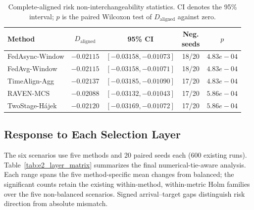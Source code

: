 \begin{table}[!htbp]
\centering
\caption{Complete-aligned risk non-interchangeability statistics.
CI denotes the 95\% interval; $p$ is the paired Wilcoxon test of
$D_{\mathrm{aligned}}$ against zero.}
\label{tab:app_e2_daligned}
\footnotesize
\setlength{\tabcolsep}{1pt}
\begin{tabular*}{\columnwidth}{@{\extracolsep{\fill}}lcccc}
\toprule
Method & $D_{\mathrm{aligned}}$ & 95\% CI & \shortstack{Neg.\\seeds} & $p$\\
\midrule
FedAsync-Window & $-0.02115$ & $[-0.03158,-0.01073]$ & 18/20 & $4.83e-04$ \\
FedAvg-Window & $-0.02115$ & $[-0.03158,-0.01071]$ & 18/20 & $4.83e-04$ \\
TimeAlign-Agg & $-0.02137$ & $[-0.03185,-0.01090]$ & 17/20 & $4.83e-04$ \\
RAVEN-MCS & $-0.02088$ & $[-0.03132,-0.01043]$ & 17/20 & $5.86e-04$ \\
TwoStage-H\'ajek & $-0.02120$ & $[-0.03169,-0.01072]$ & 17/20 & $5.86e-04$ \\
\bottomrule
\end{tabular*}
\end{table}


\subsection{Response to Each Selection Layer}

The six scenarios use five methods and 20 paired seeds each (600 existing
runs).  Table~\ref{tab:e2_layer_matrix} summarizes the final numerical-tie-aware
analysis.  Each range spans the five method-specific mean changes from balanced;
the significant counts retain the existing within-method, within-metric Holm
families over the five non-balanced scenarios.  Signed arrival--target gaps distinguish risk direction from absolute mismatch.

